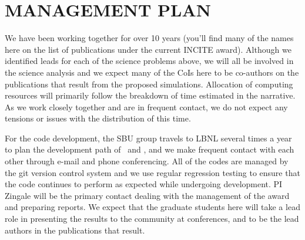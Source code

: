 \documentclass[11pt,letterpaper,english]{article}
\begin{document}
\section{MANAGEMENT PLAN}

We have been working together for over 10 years (you'll find many of
the names here on the list of publications under the current INCITE
award).  Although we identified leads for each of the science problems
above, we will all be involved in the science analysis and we expect
many of the CoIs here to be co-authors on the publications that result
from the proposed simulations.
Allocation of computing resources will primarily follow the breakdown 
of time estimated in the narrative.  As we work closely together and are
in frequent contact, we do not expect any tensions or issues with the 
distribution of this time.

For the code development, the SBU group travels to LBNL several times
a year to plan the development path of \maestro\ and \castro, and we 
make frequent contact with each other through e-mail and phone conferencing.
All of the codes are managed by the git version control system and we
use regular regression testing to ensure that the code continues to
perform as expected while undergoing development.
PI Zingale will be the primary contact dealing with the management of
the award and preparing reports.  We expect that the graduate students
here will take a lead role in presenting the results to the community
at conferences, and to be the lead authors in the publications that result.

\end{document}
